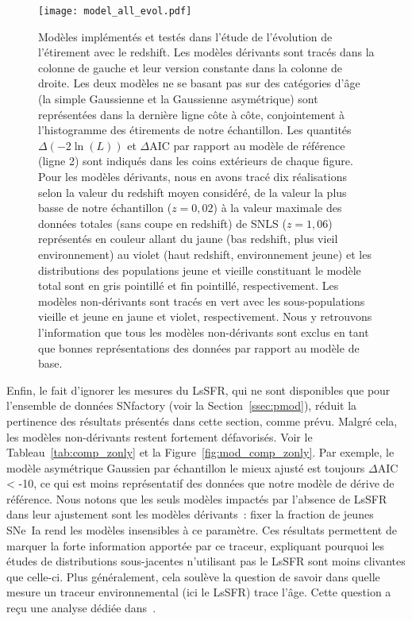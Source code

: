 \documentclass[../main/main.tex]{subfiles}
\begin{document}
\begin{figure}[p]
    \vspace*{-2.8cm}
    \centerfloat
    \texttt{[image: model\_all\_evol.pdf]}
    \caption[Modèles implémentés et testés dans l'étude de l'évolution de
    l'étirement avec le redshift]{\scriptsize Modèles implémentés et testés dans
        l'étude de l'évolution de l'étirement avec le redshift. Les modèles
        dérivants sont tracés dans la colonne de gauche et leur version
        constante dans la colonne de droite. Les deux modèles ne se basant pas
        sur des catégories d'âge (la simple Gaussienne et la Gaussienne
        asymétrique) sont représentées dans la dernière ligne côte à côte,
        conjointement à l'histogramme des étirements de notre échantillon. Les
        quantités $\Delta(-2\ln(L))$ et $\Delta$AIC par rapport au modèle de
        référence (ligne 2) sont indiqués dans les coins extérieurs de chaque
        figure. Pour les modèles dérivants, nous en avons tracé dix réalisations
        selon la valeur du redshift moyen considéré, de la valeur la plus basse
        de notre échantillon ($z = 0,02$) à la valeur maximale des données
        totales (sans coupe en redshift) de SNLS ($z = 1,06$) représentés en
        couleur allant du jaune (bas redshift, plus vieil environnement) au
        violet (haut redshift, environnement jeune) et les distributions des
        populations jeune et vieille constituant le modèle total sont en gris
        pointillé et fin pointillé, respectivement. Les modèles non-dérivants
        sont tracés en vert avec les sous-populations vieille et jeune en jaune
        et violet, respectivement. Nous y retrouvons l'information que tous les
        modèles non-dérivants sont exclus en tant que bonnes représentations des
    données par rapport au modèle de base.}
    \label{fig:mod_all}
\end{figure}

Enfin, le fait d'ignorer les mesures du LsSFR, qui ne sont disponibles que pour
l'ensemble de données SNfactory (voir la Section~\ref{ssec:pmod}), réduit la
pertinence des résultats présentés dans cette section, comme prévu. Malgré cela,
les modèles non-dérivants restent fortement défavorisés. Voir le
Tableau~\ref{tab:comp_zonly} et la Figure~\ref{fig:mod_comp_zonly}. Par exemple,
le modèle asymétrique Gaussien par échantillon le mieux ajusté est toujours
$\Delta$AIC < -10, ce qui est moins représentatif des données que notre modèle
de dérive de référence. Nous notons que les seuls modèles impactés par l'absence de
LsSFR dans leur ajustement sont les modèles dérivants~: fixer la fraction de
jeunes SNe~Ia rend les modèles insensibles à ce paramètre. Ces résultats
permettent de marquer la forte information apportée par ce traceur, expliquant
pourquoi les études de distributions sous-jacentes n'utilisant pas le LsSFR sont
moins clivantes que celle-ci. Plus généralement, cela soulève la question de
savoir dans quelle mesure un traceur environnemental (ici le LsSFR) trace l'âge.
Cette question a reçu une analyse dédiée dans~\cite{briday2022}.
\end{document}
